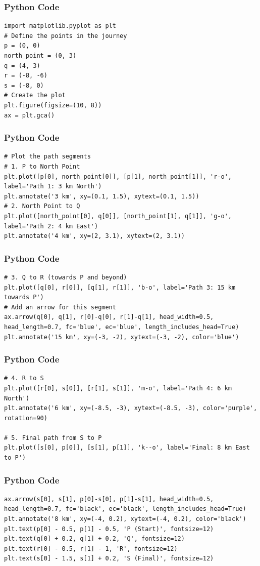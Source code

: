 \documentclass{beamer}
\begin{document}
\begin{frame}[fragile]
\frametitle{Python Code}
\begin{lstlisting}
import matplotlib.pyplot as plt
# Define the points in the journey
p = (0, 0)
north_point = (0, 3)
q = (4, 3)
r = (-8, -6)
s = (-8, 0)
# Create the plot
plt.figure(figsize=(10, 8))
ax = plt.gca()
\end{lstlisting}
\end{frame}

\begin{frame}[fragile]
\frametitle{Python Code}
\begin{lstlisting}
# Plot the path segments
# 1. P to North Point
plt.plot([p[0], north_point[0]], [p[1], north_point[1]], 'r-o', label='Path 1: 3 km North')
plt.annotate('3 km', xy=(0.1, 1.5), xytext=(0.1, 1.5))
# 2. North Point to Q
plt.plot([north_point[0], q[0]], [north_point[1], q[1]], 'g-o', label='Path 2: 4 km East')
plt.annotate('4 km', xy=(2, 3.1), xytext=(2, 3.1))
\end{lstlisting}
\end{frame}

\begin{frame}[fragile]
\frametitle{Python Code}
\begin{lstlisting}
# 3. Q to R (towards P and beyond)
plt.plot([q[0], r[0]], [q[1], r[1]], 'b-o', label='Path 3: 15 km towards P')
# Add an arrow for this segment
ax.arrow(q[0], q[1], r[0]-q[0], r[1]-q[1], head_width=0.5, head_length=0.7, fc='blue', ec='blue', length_includes_head=True)
plt.annotate('15 km', xy=(-3, -2), xytext=(-3, -2), color='blue')
\end{lstlisting}
\end{frame}

\begin{frame}[fragile]
\frametitle{Python Code}
\begin{lstlisting}
# 4. R to S
plt.plot([r[0], s[0]], [r[1], s[1]], 'm-o', label='Path 4: 6 km North')
plt.annotate('6 km', xy=(-8.5, -3), xytext=(-8.5, -3), color='purple', rotation=90)

# 5. Final path from S to P
plt.plot([s[0], p[0]], [s[1], p[1]], 'k--o', label='Final: 8 km East to P')
\end{lstlisting}
\end{frame}

\begin{frame}[fragile]
\frametitle{Python Code}
\begin{lstlisting}
ax.arrow(s[0], s[1], p[0]-s[0], p[1]-s[1], head_width=0.5, head_length=0.7, fc='black', ec='black', length_includes_head=True)
plt.annotate('8 km', xy=(-4, 0.2), xytext=(-4, 0.2), color='black')
plt.text(p[0] - 0.5, p[1] - 0.5, 'P (Start)', fontsize=12)
plt.text(q[0] + 0.2, q[1] + 0.2, 'Q', fontsize=12)
plt.text(r[0] - 0.5, r[1] - 1, 'R', fontsize=12)
plt.text(s[0] - 1.5, s[1] + 0.2, 'S (Final)', fontsize=12)
\end{lstlisting}
\end{frame}
\end{document}

